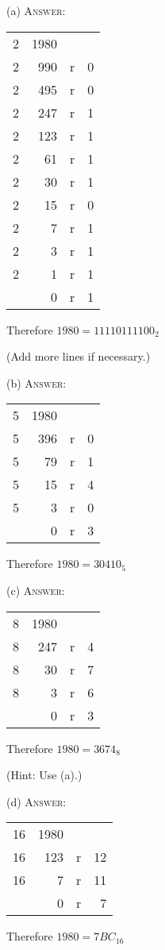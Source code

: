 (a)
\textsc{Answer:}\vspace{-2mm}
\begin{answerlong}
\begin{longtable}{r|rrr}
  2 & 1980 &   &   \\ \cline{2-4}
  2 &  990 & r & 0 \\ \cline{2-4}
  2 &  495 & r & 0 \\ \cline{2-4}
  2 &  247 & r & 1 \\ \cline{2-4}
  2 &  123 & r & 1 \\ \cline{2-4}
  2 &   61 & r & 1 \\ \cline{2-4}
  2 &   30 & r & 1 \\ \cline{2-4}
  2 &   15 & r & 0 \\ \cline{2-4}
  2 &    7 & r & 1 \\ \cline{2-4}
  2 &    3 & r & 1 \\ \cline{2-4}
  2 &    1 & r & 1 \\ \cline{2-4}
    &    0 & r & 1 \\ \cline{2-4}
\end{longtable}
Therefore $1980 = 11110111100_{2}$
\end{answerlong}
(Add more lines if necessary.)

(b)
\textsc{Answer:}\vspace{-2mm}
\begin{answerlong}
\begin{longtable}{r|rrr}
  5 & 1980 &   &   \\ \cline{2-4}
  5 &  396 & r & 0 \\ \cline{2-4}
  5 &   79 & r & 1 \\ \cline{2-4}
  5 &   15 & r & 4 \\ \cline{2-4}
  5 &    3 & r & 0 \\ \cline{2-4}
    &    0 & r & 3 \\ \cline{2-4}
\end{longtable}
Therefore $1980 = 30410_{5}$
\end{answerlong}

(c)
\textsc{Answer:}\vspace{-2mm}
\begin{answerlong}
\begin{longtable}{r|rrr}
  8 & 1980 &   &   \\ \cline{2-4}
  8 &  247 & r & 4 \\ \cline{2-4}
  8 &   30 & r & 7 \\ \cline{2-4}
  8 &    3 & r & 6 \\ \cline{2-4}
    &    0 & r & 3 \\ \cline{2-4}
\end{longtable}
Therefore $1980 = 3674_{8}$
\end{answerlong}
(Hint: Use (a).)

(d)
\textsc{Answer:}\vspace{-2mm}
\begin{answerlong}
\begin{longtable}{r|rrr}
  16 & 1980 &   &   \\ \cline{2-4}
  16 &  123 & r & 12 \\ \cline{2-4}
  16 &    7 & r & 11 \\ \cline{2-4}
     &    0 & r &  7 \\ \cline{2-4}
\end{longtable}
Therefore $1980 = 7BC_{16}$
\end{answerlong}
